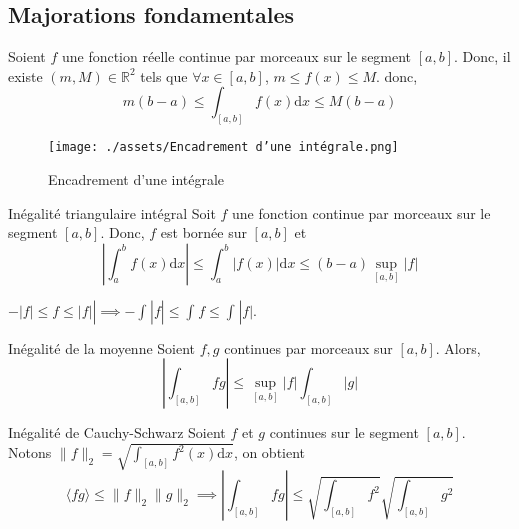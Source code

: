 \subsection{Majorations fondamentales} %
\label{sub: Majorations fondamentales} %

\begin{Theorem}{}{}
  Soient $f$ une fonction réelle continue par morceaux sur le segment $[a,b]$. Donc, il existe $(m, M) \in \mathbb{R}^{2}$ tels que $\forall x \in [a,b]$, $m \le f(x) \le M$. donc, 
  \begin{equation}
    \boxed{m(b-a) \le \int _{[a,b]} f(x) \mathrm{d} x \le M(b-a)}
  \end{equation}

  \begin{figure}[H] %
    \centering
    \texttt{[image: ./assets/Encadrement d'une intégrale.png]}
    \caption{Encadrement d'une intégrale}
    \label{fig:Encadrement d'une intégrale.png}
  \end{figure}
\end{Theorem}

\begin{Theorem}{Inégalité triangulaire intégral}{}
  Soit $f$ une fonction continue par morceaux sur le segment $[a,b]$. Donc, $f$ est bornée sur $[a,b]$ et 
  \begin{equation}
    \boxed{\left|\int_{a}^{b} f(x) \mathrm{d}x\right| \le \int_{a}^{b} |f(x)| \mathrm{d} x \le (b-a) \sup _{[a,b]}|f|}
  \end{equation}
\end{Theorem}

\begin{myproof}{}{}
$- |f| \le f \le |f|| \implies - \int_{}^{}|f| \le \int_{}^{}f \le \int_{}^{}|f| $.
\end{myproof}

\begin{Theorem}{Inégalité de la moyenne}{}
  Soient $f,g$ continues par morceaux sur $[a,b]$. Alors, 
  \begin{equation}
    \left| \int_{[a,b]}^{} fg\right| \le \sup _{[a,b]} |f| \int_{[a,b]}^{}|g|
  \end{equation}
\end{Theorem}

\begin{Theorem}{Inégalité de Cauchy-Schwarz}{}
  Soient $f$ et $g$ continues sur le segment $[a,b]$. Notons $\|f \|_2 = \sqrt{\int_{[a,b]}^{}f ^{2}(x) \mathrm{d}x}$, on obtient 
  \begin{equation}
    \langle fg \rangle \le\| f \|_2 \| g \|_2 \implies\boxed{\left| \int_{[a,b]}^{}fg \right| \le \sqrt{\int_{[a,b]}^{}f ^{2}} \sqrt{\int_{[a,b]}^{}g ^{2}}}
  \end{equation}
\end{Theorem}

